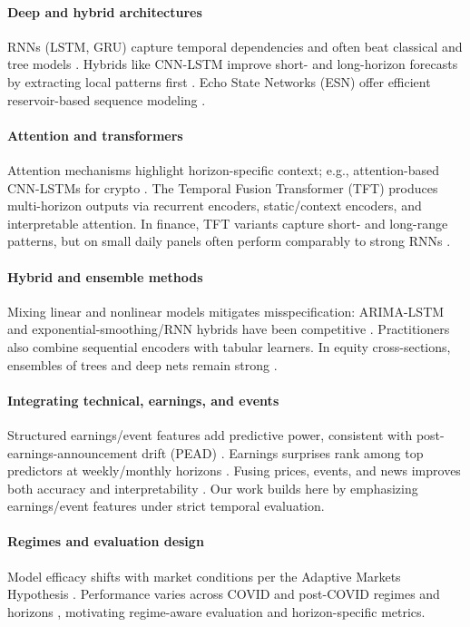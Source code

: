\documentclass[conference,a4paper]{IEEEtran}
\begin{document}
\paragraph{Deep and hybrid architectures} RNNs (LSTM, GRU) capture temporal dependencies and often beat classical and tree models \citep{hochreiter1997long,cho2014learning,fischer2018,selvin2017}. Hybrids like CNN-LSTM improve short- and long-horizon forecasts by extracting local patterns first \citep{selvin2017}. Echo State Networks (ESN) offer efficient reservoir-based sequence modeling \citep{jaeger2001esn}.

\paragraph{Attention and transformers} Attention mechanisms highlight horizon-specific context; e.g., attention-based CNN-LSTMs for crypto \citep{xu2022bitcoin}. The Temporal Fusion Transformer (TFT) \citep{lim2021temporal} produces multi-horizon outputs via recurrent encoders, static/context encoders, and interpretable attention. In finance, TFT variants capture short- and long-range patterns, but on small daily panels often perform comparably to strong RNNs \citep{zhang2023review}.

\paragraph{Hybrid and ensemble methods} Mixing linear and nonlinear models mitigates misspecification: ARIMA-LSTM and exponential-smoothing/RNN hybrids have been competitive \citep{smyl2020}. Practitioners also combine sequential encoders with tabular learners. In equity cross-sections, ensembles of trees and deep nets remain strong \citep{krauss2017}.

\paragraph{Integrating technical, earnings, and events} Structured earnings/event features add predictive power, consistent with post-earnings-announcement drift (PEAD) \citep{bernard1989}. Earnings surprises rank among top predictors at weekly/monthly horizons \citep{schnaubelt2020}. Fusing prices, events, and news improves both accuracy and interpretability \citep{cheng2022}. Our work builds here by emphasizing earnings/event features under strict temporal evaluation.

\paragraph{Regimes and evaluation design} Model efficacy shifts with market conditions per the Adaptive Markets Hypothesis \citep{lo2004}. Performance varies across COVID and post-COVID regimes and horizons \citep{zhang2023review}, motivating regime-aware evaluation and horizon-specific metrics.
\end{document}

